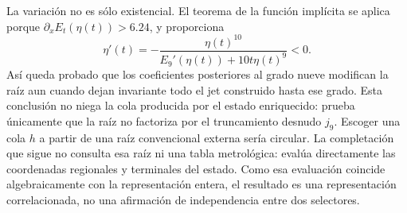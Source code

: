 La variación no es sólo existencial. El teorema de la función implícita se
aplica porque \(\partial_xE_t(\eta(t))>6.24\), y proporciona
\begin{equation}
 \eta'(t)=-
 \frac{\eta(t)^{10}}
 {E_9'(\eta(t))+10t\eta(t)^9}<0.
 \label{eq:alpha-variacion-raiz-prolongacion}
\end{equation}
Así queda probado que los coeficientes posteriores al grado nueve modifican
la raíz aun cuando dejan invariante todo el jet construido hasta ese grado.
Esta conclusión no niega la cola producida por el estado enriquecido: prueba
únicamente que la raíz no factoriza por el truncamiento desnudo
\(j_9\). Escoger una cola \(h\) a partir de una raíz convencional externa
sería circular. La completación que sigue no consulta esa raíz ni una tabla
metrológica: evalúa directamente las coordenadas regionales y terminales del
estado. Como esa evaluación coincide algebraicamente con la representación
entera, el resultado es una representación correlacionada, no una afirmación
de independencia entre dos selectores.


\endinput

\subsubsection{Lector completo, naturalidad y cilindros comunes}

Sea \(F_{\mathsf s}\) el cuerpo de coeficientes de la firma de
\(\mathsf s\in\mathcal X_\alpha^{\mathrm{enr}}\) y sea \(d_m=6+3m\). Se
definen
\[
 \mathfrak J_m:=\coprod_{\mathsf s\in\mathcal X_\alpha^{\mathrm{enr}}}
 \{\mathsf s\}\times F_{\mathsf s}[X]/(X^{d_m+1}),\qquad
 \Gamma_m(\mathsf s)=
 \bigl(\mathsf s,E_{21/22}^{(d_m)}(\mathsf s;X)\bigr).
\]
El lector completo registrado \(\Gamma_{E21}\) produce estas representaciones.
Para \(m'\ge m\), el truncamiento
\(
 \tau_{m',m}(\mathsf s,[f]_{d_{m'}})
 =(\mathsf s,[f]_{d_m})
\)
satisface
\begin{equation}
 \tau_{m',m}\circ\Gamma_{m'}=\Gamma_m,
 \qquad
 E_{21/22}:=\varprojlim_mE_{21/22}^{(d_m)}.
 \tag{A3}
 \label{eq:alpha-sistema-analitico-completo}
\end{equation}
No se añade una sección del truncamiento desnudo. Si se explicita la
representación de los tres coeficientes siguientes, ésta es la proyección
derivada
\[
 \Lambda_{d_m+1:d_m+3}
 :=\operatorname{pr}_{d_m+1:d_m+3}\circ
   \Gamma_{E21}\circ\mathcal U_{\mathrm{TPK}},
\]
no un generador independiente ni una lectura del valor objetivo.

